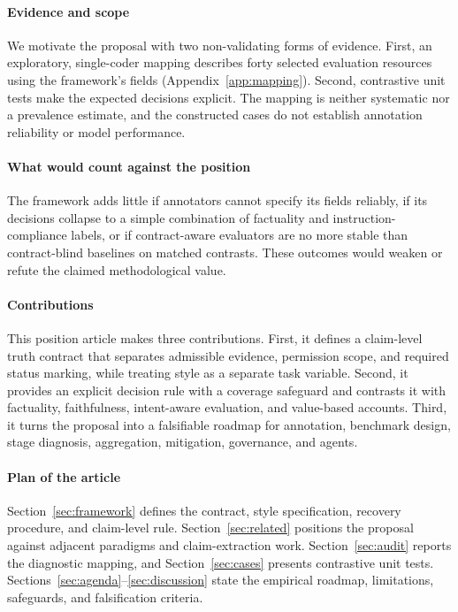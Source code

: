 \documentclass{clv2025}
\begin{document}
\paragraph{Evidence and scope}
We motivate the proposal with two non-validating forms of evidence.
First, an exploratory, single-coder mapping describes forty selected evaluation resources using the framework's fields (Appendix~\ref{app:mapping}).
Second, contrastive unit tests make the expected decisions explicit.
The mapping is neither systematic nor a prevalence estimate, and the constructed cases do not establish annotation reliability or model performance.

\paragraph{What would count against the position}
The framework adds little if annotators cannot specify its fields reliably, if its decisions collapse to a simple combination of factuality and instruction-compliance labels, or if contract-aware evaluators are no more stable than contract-blind baselines on matched contrasts.
These outcomes would weaken or refute the claimed methodological value.

\paragraph{Contributions}
This position article makes three contributions.
First, it defines a claim-level truth contract that separates admissible evidence, permission scope, and required status marking, while treating style as a separate task variable.
Second, it provides an explicit decision rule with a coverage safeguard and contrasts it with factuality, faithfulness, intent-aware evaluation, and value-based accounts.
Third, it turns the proposal into a falsifiable roadmap for annotation, benchmark design, stage diagnosis, aggregation, mitigation, governance, and agents.

\paragraph{Plan of the article}
Section~\ref{sec:framework} defines the contract, style specification, recovery procedure, and claim-level rule.
Section~\ref{sec:related} positions the proposal against adjacent paradigms and claim-extraction work.
Section~\ref{sec:audit} reports the diagnostic mapping, and Section~\ref{sec:cases} presents contrastive unit tests.
Sections~\ref{sec:agenda}--\ref{sec:discussion} state the empirical roadmap, limitations, safeguards, and falsification criteria.
\end{document}
